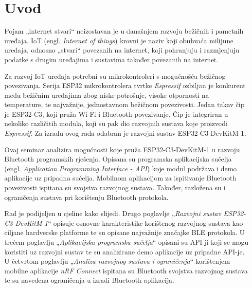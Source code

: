 \chapter{Uvod}

Pojam „internet stvari“ neizostavan je u današnjem razvoju bežičnih i pametnih uređaja. IoT (engl. \textit{Internet of things}) krovni je naziv koji obuhvaća milijune uređaja, odnosno „stvari“ povezanih na internet, koji pohranjuju i razmjenjuju podatke s drugim uređajima i sustavima također povezanih na internet. \cite{what_is_iot} 

Za razvoj IoT uređaja potrebni su mikrokontroleri s mogućnošću bežičnog povezivanja. Serija ESP32 mikrokontrolera tvrtke \textit{Espressif} ozbiljan je konkurent među bežičnim uređajima zbog niske potrošnje, visoke otpornosti na temperature, te najvažnije, jednostavnom bežičnom povezivosti. \cite{rasp_pi_esp} Jedan takav čip je ESP32-C3, koji pruža Wi-Fi i Bluetooth povezivanje. Čip je integriran u nekoliko različitih modula, koji su pak dio razvojnih sustava koje proizvodi \textit{Espressif}. Za izradu ovog rada odabran je razvojni sustav ESP32-C3-DevKitM-1.

Ovaj seminar analizira mogućnosti koje pruža ESP32-C3-DevKitM-1 u razvoju Bluetooth programskih rješenja. Opisana su programska aplikacijska sučelja (engl. \textit{Application Programming Interface - API}) koje modul podržava i demo aplikacije uz pripadna sučelja. Mobilnom aplikacijom za ispitivanje Bluetooth povezivosti ispitana su svojstva razvojnog sustava. Također, razložena su i ograničenja sustava pri korištenju Bluetooth protokola.

Rad je podijeljen u cjeline kako slijedi. Drugo poglavlje „\textit{Razvojni sustav ESP32-C3-DevKitM-1}“ opisuje osnovne karakteristike korištenog razvojnog sustava kao ciljane hardverske platforme te su opisane najvažnije značajke BLE protokola. U trećem poglavlju „\textit{Aplikacijska programska sučelja}“ opisani su API-ji koji se mogu koristiti uz razvojni sustav te su analizirane demo aplikacije uz pripadne API-je. U četvrtom poglavlju „\textit{Analiza razvojnog sustava i ograničenja}“ korištenjem mobilne aplikacije \textit{nRF Connect} ispitana su Bluetooth svojstva razvojnog sustava te su navedena ograničenja u izradi Bluetooth aplikacija.

\eject